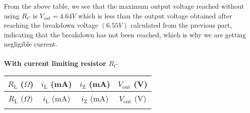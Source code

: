 \documentclass[12pt]{article}
\begin{document}
From the above table, we see that the maximum output voltage reached without using $R_C$ is $V_{out} =4.64 V$ which is less than the output voltage obtained after reaching the breakdown voltage $(6.55 V)$ calculated from the previous part, indicating that the breakdown has not been reached, which is why we are getting negligible current.\\
\\
\textbf{With current limiting resistor $R_C$}
\begin{longtable}{|c|c|c|c|}
    \hline
    $R_\text{L}$ ($\Omega$) & $i_\text{L}$ (mA) & $i_\text{Z}$ (mA) & $V_\text{out}$ (V) \\ 
    \hline
    \endfirsthead
    \hline
    $R_\text{L}$ ($\Omega$) & $i_\text{L}$ (mA) & $i_\text{Z}$ (mA) & $V_\text{out}$ (V) \\ 
    \hline
    \endhead

    \endfoot


\end{longtable}
\end{document}
